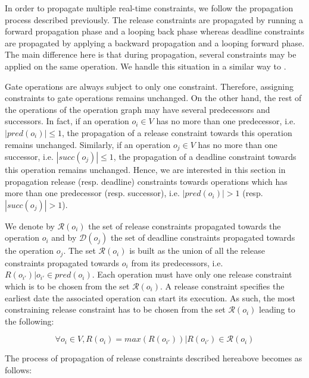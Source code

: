 In order to propagate multiple real-time constraints, we follow the propagation process described previously. The release constraints are propagated by running a forward propagation phase and a looping back phase whereas deadline constraints are propagated by applying a backward propagation and a looping forward phase. The main difference here is that during propagation, several constraints may be applied on the same operation. We handle this situation in a similar way to \cite{faure:2011}.

Gate operations are always subject to only one constraint. Therefore, assigning constraints to gate operations remains unchanged. On the other hand, the rest of the operations of the operation graph may have several predecessors and successors. In fact, if an operation $o_i \in V$ has no more than one predecessor, i.e. $|pred(o_i)| \leq 1$, the propagation of a release constraint towards this operation remains unchanged. Similarly, if an operation $o_j \in V$ has no more than one successor, i.e. $|succ(o_j)| \leq 1$, the propagation of a deadline constraint towards this operation remains unchanged. Hence, we are interested in this section in propagation release (resp. deadline) constraints towards operations which has more than one predecessor (resp. successor), i.e. $|pred(o_i)| > 1$ (resp. $|succ(o_j)| > 1$). 

We denote by $\mathcal{R}(o_i)$ the set of release constraints propagated towards the operation $o_i$ and by $\mathcal{D}(o_j)$ the set of deadline constraints propagated towards the operation $o_j$. The set $\mathcal{R}(o_i)$ is built as the union of all the release constraints propagated towards $o_i$ from its predecessors, i.e. $R(o_{i'}) | o_{i'} \in pred(o_i)$. Each operation must have only one release constraint which is to be chosen from the set $\mathcal{R}(o_i)$. A release constraint specifies the earliest date the associated operation can start its execution. As such, the most constraining release constraint has to be chosen from the set $\mathcal{R}(o_i)$ leading to the following:

\begin{equation}
\forall o_i \in V, R(o_i) = max(R(o_{i'})) | R(o_{i'}) \in \mathcal{R}(o_i)
\label{eq:mulrel}
\end{equation}

The process of propagation of release constraints described hereabove becomes as follows:

